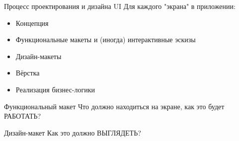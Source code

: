 \documentclass[aspectratio=169,handout,bigger]{beamer}
\begin{document}

\begin{frame}{Процесс проектирования и дизайна UI}
  Для каждого "экрана" в приложении:

  \begin{itemize}
    \item Концепция
    \item Функциональные макеты и (иногда) интерактивные эскизы
    \item Дизайн-макеты
    \item Вёрстка
    \item Реализация бизнес-логики
  \end{itemize}
\end{frame}


\begin{frame}{Функциональный макет}
  Что должно находиться на экране, как это будет РАБОТАТЬ?

\end{frame}


\begin{frame}{Дизайн-макет}
  Как это должно ВЫГЛЯДЕТЬ?

\end{frame}
\end{document}
